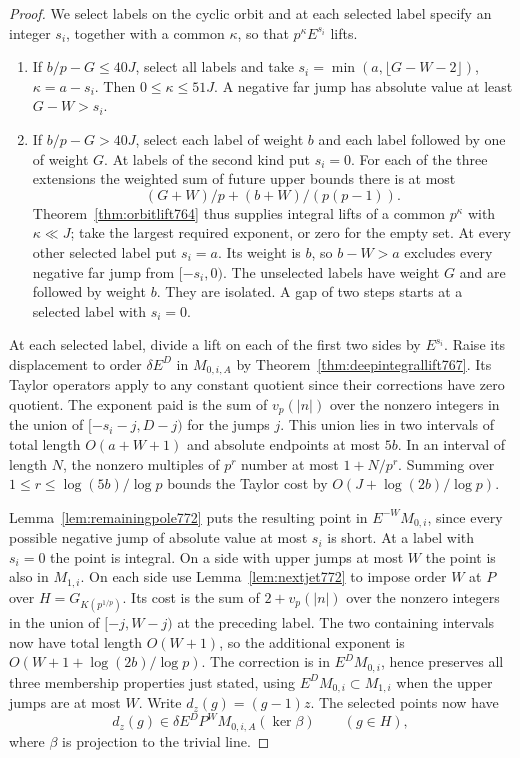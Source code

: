 \documentclass[a4paper,11pt]{article}
\theoremstyle{definition}
\theoremstyle{remark}
\numberwithin{equation}{section}
\begin{document}
\begin{proof}
We select labels on the cyclic orbit and at each selected label
specify an integer \(s_i\), together with a common \(\kappa\),
so that \(p^\kappa E^{s_i}\) lifts.
\begin{enumerate}
\item If \(b/p-G\le40J\), select all labels and take
\(s_i=\min(a,\lfloor G-W-2\rfloor)\), \(\kappa=a-s_i\).
Then \(0\le\kappa\le51J\). A negative far jump has absolute
value at least \(G-W>s_i\).
\item If \(b/p-G>40J\), select each label of weight \(b\)
and each label followed by one of weight \(G\). At labels
of the second kind put \(s_i=0\). For each of the three
extensions the weighted sum of future upper bounds there
is at most
\[
            (G+W)/p+(b+W)/(p(p-1)).
\]
Theorem~\ref{thm:orbitlift764} thus supplies integral lifts
of a common \(p^\kappa\) with \(\kappa\ll J\); take the
largest required exponent, or zero for the empty set.
At every other selected label put \(s_i=a\). Its weight
is \(b\), so \(b-W>a\) excludes every negative far jump
from \([-s_i,0)\). The unselected labels have weight \(G\)
and are followed by weight \(b\). They are isolated. A gap
of two steps starts at a selected label with \(s_i=0\).
\end{enumerate}

At each selected label, divide a lift on each of the first
two sides by \(E^{s_i}\). Raise its displacement to order
\(\delta E^D\) in \(M_{0,i,A}\) by Theorem~\ref{thm:deepintegrallift767}.
Its Taylor operators apply to any constant quotient since their
corrections have zero quotient. The exponent paid is the sum
of \(v_p(|n|)\) over the nonzero integers in the union of
\([-s_i-j,D-j)\) for the jumps \(j\). This union lies in two
intervals of total length \(O(a+W+1)\) and absolute endpoints
at most \(5b\). In an interval of length \(N\), the nonzero
multiples of \(p^r\) number at most \(1+N/p^r\). Summing over
\(1\le r\le\log(5b)/\log p\) bounds the Taylor cost by
\(O(J+\log(2b)/\log p)\).

Lemma~\ref{lem:remainingpole772} puts the resulting point
in \(E^{-W}M_{0,i}\), since every possible negative jump of
absolute value at most \(s_i\) is short. At a label with
\(s_i=0\) the point is integral. On a side with upper
jumps at most \(W\) the point is also in \(M_{1,i}\).
On each side use Lemma~\ref{lem:nextjet772} to impose order
\(W\) at \(P\) over \(H=G_{K(p^{1/p})}\).
Its cost is the sum of \(2+v_p(|n|)\) over the nonzero
integers in the union of \([-j,W-j)\) at the preceding
label. The two containing intervals now have total length
\(O(W+1)\), so the additional exponent is
\(O(W+1+\log(2b)/\log p)\). The correction is in
\(E^D M_{0,i}\), hence preserves all three membership
properties just stated, using \(E^D M_{0,i}\subset M_{1,i}\)
when the upper jumps are at most \(W\).
Write \(d_z(g)=(g-1)z\). The selected points now have
\[
          d_z(g)\in\delta E^D P^W M_{0,i,A}(\ker\beta)
                         \qquad (g\in H),
\]
where \(\beta\) is projection to the trivial line.


\end{proof}
\end{document}
